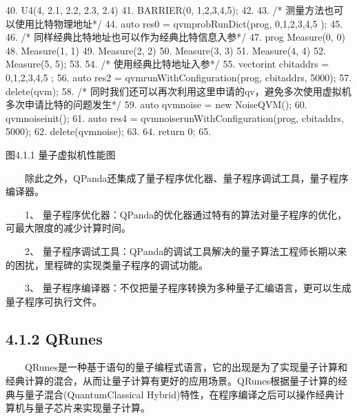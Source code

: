 \documentclass[a4paper,11pt,english]{sphinxmanual}
\begin{document}
\begin{sphinxVerbatim}[commandchars=\\\{\}]
40.        \PYGZlt{}\PYGZlt{} U4(4, 2.1, 2.2, 2.3, 2.4)
41.        \PYGZlt{}\PYGZlt{} BARRIER(\PYGZob{}0, 1,2,3,4,5\PYGZcb{});
42.
43.    /* 测量方法也可以使用比特物理地址*/
44.    auto res\PYGZus{}0 = qvm\PYGZhy{}\PYGZgt{}probRunDict(prog, \PYGZob{} 0,1,2,3,4,5 \PYGZcb{});
45.
46.    /* 同样经典比特地址也可以作为经典比特信息入参*/
47.    prog \PYGZlt{}\PYGZlt{} Measure(0, 0)
48.        \PYGZlt{}\PYGZlt{} Measure(1, 1)
49.        \PYGZlt{}\PYGZlt{} Measure(2, 2)
50.        \PYGZlt{}\PYGZlt{} Measure(3, 3)
51.        \PYGZlt{}\PYGZlt{} Measure(4, 4)
52.        \PYGZlt{}\PYGZlt{} Measure(5, 5);
53.
54.    /* 使用经典比特地址入参*/
55.    vector\PYGZlt{}int\PYGZgt{} cbit\PYGZus{}addrs = \PYGZob{} 0,1,2,3,4,5 \PYGZcb{};
56.    auto res\PYGZus{}2 = qvm\PYGZhy{}\PYGZgt{}runWithConfiguration(prog, cbit\PYGZus{}addrs, 5000);
57.    delete(qvm);
58.    /* 同时我们还可以再次利用这里申请的qv，避免多次使用虚拟机多次申请比特的问题发生*/
59.    auto qvm\PYGZus{}noise = new NoiseQVM();
60.    qvm\PYGZus{}noise\PYGZhy{}\PYGZgt{}init();
61.    auto res\PYGZus{}4 = qvm\PYGZus{}noise\PYGZhy{}\PYGZgt{}runWithConfiguration(prog, cbit\PYGZus{}addrs, 5000);
62.    delete(qvm\PYGZus{}noise);
63.
64.    return 0;
65.\PYGZcb{}
\end{sphinxVerbatim}


\begin{center}图4.1.1 量子虚拟机性能图
\end{center}
\sphinxAtStartPar
  除此之外，QPanda还集成了量子程序优化器、量子程序调试工具，量子程序编译器。

\sphinxAtStartPar
  1、 量子程序优化器：QPanda的优化器通过特有的算法对量子程序的优化，可最大限度的减少计算时间。

\sphinxAtStartPar
  2、 量子程序调试工具：QPanda的调试工具解决的量子算法工程师长期以来的困扰，里程碑的实现类量子程序的调试功能。

\sphinxAtStartPar
  3、 量子程序编译器：不仅把量子程序转换为多种量子汇编语言，更可以生成量子程序可执行文件。


\subsection{4.1.2 QRunes}
\label{\detokenize{rst/4.1_u91cf_u5b50_u8f6f_u4ef6_u5f00_u53d1_u73af_u5883:qrunes}}
\sphinxAtStartPar
  QRunes是一种基于语句的量子编程式语言，它的出现是为了实现量子计算和经典计算的混合，从而让量子计算有更好的应用场景。QRunes根据量子计算的经典与量子混合(Quantum\sphinxhyphen{}Classical Hybrid)特性，在程序编译之后可以操作经典计算机与量子芯片来实现量子计算。
\end{document}
